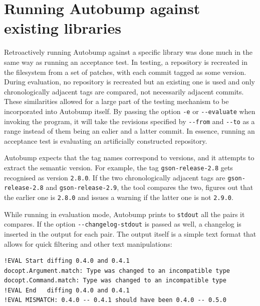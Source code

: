 \documentclass{l4proj}
\newcommand\genericstyle{\lstset{basicstyle=\ttm}}
\newcommand\codeinline[1]{{\genericstyle\lstinline!#1!}}
\begin{document}
\section{Running Autobump against existing libraries}

Retroactively running Autobump against a specific library was done
much in the same way as running an acceptance test. In testing, a
repository is recreated in the filesystem from a set of patches, with
each commit tagged as some version. During evaluation, no repository
is recreated but an existing one is used and only chronologically
adjacent tags are compared, not necessarily adjacent commits. These
similarities allowed for a large part of the testing mechanism to be
incorporated into Autobump itself. By passing the option
\codeinline{-e} or \codeinline{--evaluate} when invoking the program,
it will take the revisions specified by \codeinline{--from} and
\codeinline{--to} as a range instead of them being an ealier and a
latter commit. In essence, running an acceptance test is evaluating an
artificially constructed repository.

Autobump expects that the tag names correspond to versions, and it
attempts to extract the semantic version. For example, the tag
\codeinline{gson-release-2.8} gets recognised as version
\codeinline{2.8.0}. If the two chronologically adjacent tags are
\codeinline{gson-release-2.8} and \codeinline{gson-release-2.9}, the
tool compares the two, figures out that the earlier one is
\codeinline{2.8.0} and issues a warning if the latter one is not
\codeinline{2.9.0}.

While running in evaluation mode, Autobump prints to
\codeinline{stdout} all the pairs it compares. If the option
\codeinline{--changelog-stdout} is passed as well, a changelog is
inserted in the output for each pair. The output itself is a simple
text format that allows for quick filtering and other text
manipulations:

\begin{center}
\begin{BVerbatim}
!EVAL Start diffing 0.4.0 and 0.4.1
docopt.Argument.match: Type was changed to an incompatible type
docopt.Command.match: Type was changed to an incompatible type
!EVAL End   diffing 0.4.0 and 0.4.1
!EVAL MISMATCH: 0.4.0 -- 0.4.1 should have been 0.4.0 -- 0.5.0
\end{BVerbatim}
\end{center}
\end{document}
